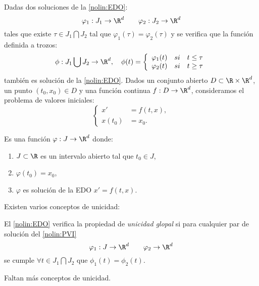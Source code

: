 Dadas dos soluciones de la \ref{nolin:EDO}:
$$\varphi_1:J_1\to \R^d \qquad \varphi_2 : J_2 \to \R^d$$
tales que existe $\tau \in J_1 \bigcap J_2 $ tal que $\varphi_1(\tau)=\varphi_2(\tau)$ y se verifica que la función definida a trozos:
$$
\phi : J_1 \bigcup J_2 \to \R^d, \quad \phi(t)=\left \{ \begin{array}{lcr}
\varphi_1(t) & si & t\leq \tau \\
\varphi_2(t) &  si & t\geq \tau
\end{array}
\right .
$$
también es solución de la \ref{nolin:EDO}.
Dados un conjunto abierto $D \subset \R \times \R^d$, un punto $(t_0,x_0)\in D$ y una función continua $f:D\to\R^d$, consideramos el problema de valores iniciales:
\begin{equation}
\left\{\begin{array}{rl}
x' &=f(t,x), \\
x(t_0)&=x_0.
\end{array}\right.
\tag{PVI}\label{nolin:PVI}
\end{equation}
\begin{ndef}
Es una función $\varphi : J \to \R^d$ donde:
\begin{enumerate}
\item $J\subset \R$ es un intervalo abierto tal que $t_0\in J$,
\item $\varphi(t_0)=x_0$,
\item $\varphi$ es solución de la EDO $x'=f(t,x)$.
\end{enumerate}
\end{ndef}

Existen varios conceptos de unicidad:

\begin{ndef}
El \ref{nolin:EDO} verifica la propiedad de \emph{unicidad glopal} si para cualquier par de solución del \ref{nolin:PVI}
$$\varphi_1:J\to\R^d \qquad \varphi_2\to\R^d$$
se cumple $\forall t \in J_1 \bigcap J_2$ que $\phi_1(t)=\phi_2(t)$.
\end{ndef}
\begin{ndef}

\end{ndef}

Faltan más conceptos de unicidad.
